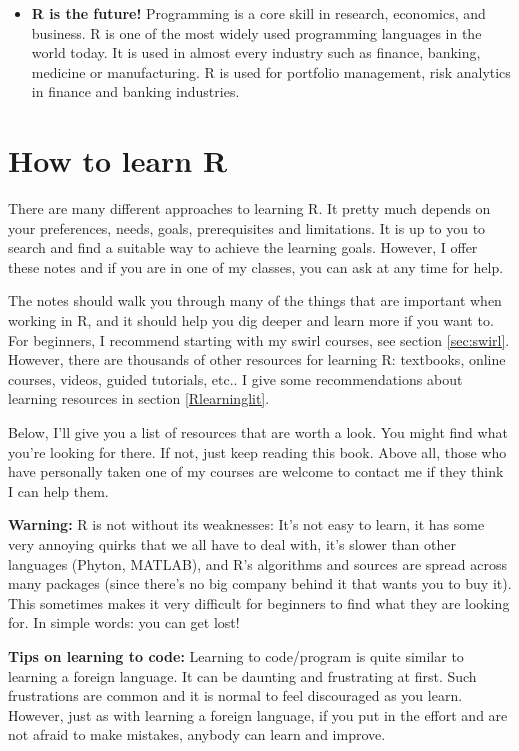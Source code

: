 \documentclass[
  12pt,
  oneside]{book}
\begin{document}
\begin{itemize}
\item
  \textbf{R is the future!} Programming is a core skill in research, economics, and business. R is one of the most widely used programming languages in the world today. It is used in almost every industry such as finance, banking, medicine or manufacturing. R is used for portfolio management, risk analytics in finance and banking industries.
\end{itemize}

\hypertarget{howtolearnr}{%
\section{How to learn R}\label{howtolearnr}}

There are many different approaches to learning R. It pretty much depends on your preferences, needs, goals, prerequisites and limitations. It is up to you to search and find a suitable way to achieve the learning goals. However, I offer these notes and if you are in one of my classes, you can ask at any time for help.

The notes should walk you through many of the things that are important when working in R, and it should help you dig deeper and learn more if you want to. For beginners, I recommend starting with my swirl courses, see section \ref{sec:swirl}. However, there are thousands of other resources for learning R: textbooks, online courses, videos, guided tutorials, etc.. I give some recommendations about learning resources in section \ref{Rlearninglit}.

Below, I'll give you a list of resources that are worth a look. You might find what you're looking for there. If not, just keep reading this book. Above all, those who have personally taken one of my courses are welcome to contact me if they think I can help them.

\textbf{Warning:} R is not without its weaknesses: It's not easy to learn, it has some very annoying quirks that we all have to deal with, it's slower than other languages (Phyton, MATLAB), and R's algorithms and sources are spread across many packages (since there's no big company behind it that wants you to buy it). This sometimes makes it very difficult for beginners to find what they are looking for. In simple words: you can get lost!

\textbf{Tips on learning to code:}
Learning to code/program is quite similar to learning a foreign language. It can be daunting and frustrating at first. Such frustrations are common and it is normal to feel discouraged as you learn. However, just as with learning a foreign language, if you put in the effort and are not afraid to make mistakes, anybody can learn and improve.
\end{document}
